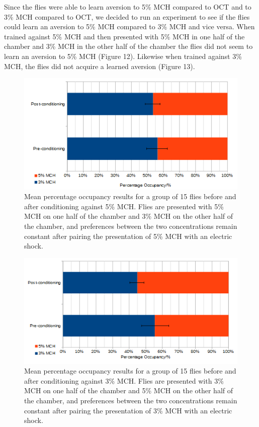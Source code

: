 \documentclass{article}
\begin{document}
Since the flies were able to learn aversion to 5\% MCH compared to OCT and to 3\% MCH compared to OCT, we decided to run an experiment to see if the flies could learn an aversion to 5\% MCH compared to 3\% MCH and vice versa. When trained against 5\% MCH and then presented with 5\% MCH in one half of the chamber and 3\% MCH in the other half of the chamber the flies did not seem to learn an aversion to 5\% MCH (Figure 12). Likewise when trained against 3\% MCH, the flies did not acquire a learned aversion (Figure 13). %
\begin{figure}[h]
\begin{center}
\includegraphics[width=1\textwidth]{Figures/5MCH_vs_3}
\caption{Mean percentage occupancy results for a group of 15 flies before and after conditioning against 5\% MCH. Flies are presented with 5\% MCH on one half of the chamber and 3\% MCH on the other half of the chamber, and preferences between the two concentrations remain constant after pairing the presentation of 5\% MCH with an electric shock.}
\end{center}
\end{figure}

\begin{figure}[h]
\begin{center}
\includegraphics[width=1\textwidth]{Figures/3MCH_vs_5}
\caption{Mean percentage occupancy results for a group of 15 flies before and after conditioning against 3\% MCH. Flies are presented with 3\% MCH on one half of the chamber and 5\% MCH on the other half of the chamber, and preferences between the two concentrations remain constant after pairing the presentation of 3\% MCH with an electric shock.}
\end{center}
\end{figure}
\end{document}
